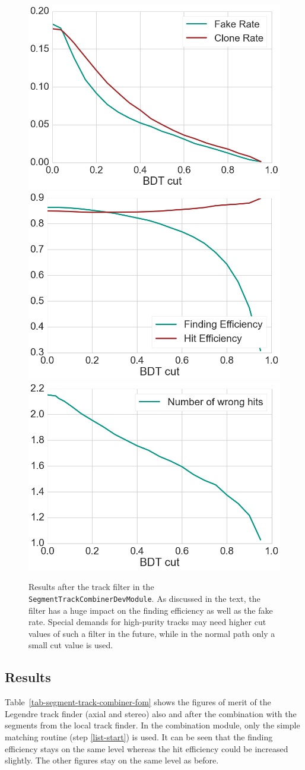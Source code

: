 \begin{figure}
  \centering
  \includegraphics[width=0.48\linewidth]{figures/workflow/track_filter_rate.png}
  \includegraphics[width=0.48\linewidth]{figures/workflow/track_filter_efficiency.png}
  \includegraphics[width=0.48\linewidth]{figures/workflow/track_filter_wrong_hits.png}
  \caption{Results after the track filter in the \texttt{SegmentTrackCombinerDevModule}. As discussed in the text, the filter has a huge impact on the finding efficiency as well as the fake rate. Special demands for high-purity tracks may need higher cut values of such a filter in the future, while in the normal path only a small cut value is used.}
  \label{fig-track-filter-results}
\end{figure}

\subsection{Results}

Table~\ref{tab-segment-track-combiner-fom} shows the figures of merit of the Legendre track finder (axial and stereo) also and after the combination with the segments from the local track finder. In the combination module, only the simple matching routine (step \ref{list-start}) is used. It can be seen that the finding efficiency stays on the same level whereas the hit efficiency could be increased slightly. The other figures stay on the same level as before. 

